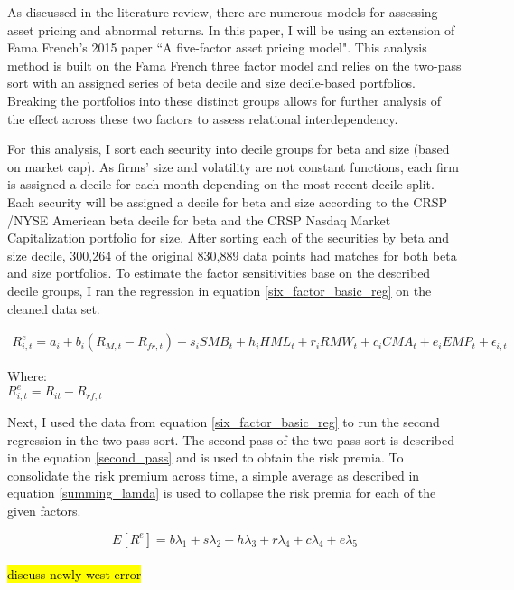 As discussed in the literature review, there are numerous models for assessing asset pricing and abnormal returns. In this paper, I will be using an extension of Fama French's 2015 paper ``A five-factor asset pricing model". This analysis method is built on the Fama French three factor model and relies on the two-pass sort with an assigned series of beta decile and size decile-based portfolios. Breaking the portfolios into these distinct groups allows for further analysis of the effect across these two factors to assess relational interdependency. 

For this analysis, I sort each security into decile groups for beta and size (based on market cap). As firms' size and volatility are not constant functions, each firm is assigned a decile for each month depending on the most recent decile split.  Each security will be assigned a decile for beta and size according to the CRSP /NYSE American beta decile for beta and the CRSP Nasdaq Market Capitalization portfolio for size. After sorting each of the securities by beta and size decile, 300,264 of the original 830,889 data points had matches for both beta and size portfolios. To estimate the factor sensitivities base on the described decile groups, I ran the regression in equation \eqref{six_factor_basic_reg} on the cleaned data set. 




\begin{equation}
\begin{split}
    R_{i,t}^e = a_i+b_i(R_{M,t}-R_{fr,t})+s_iSMB_t+ h_iHML_t+  r_iRMW_t+c_iCMA_t+e_iEMP_t +\epsilon_{i,t}
    \end{split}
    \label{six_factor_basic_reg}
\end{equation}

\begin{center}
Where:\\
    $R_{i,t}^e = R_{it}-R_{rf,t}$
\end{center}

Next, I used the data from equation \eqref{six_factor_basic_reg} to run the second regression in the two-pass sort. The second pass of the two-pass sort is described in the equation  \eqref{second_pass} and is used to obtain the risk premia. To consolidate the risk premium across time, a simple average as described in equation \eqref{summing_lamda} is used to collapse the risk premia for each of the given factors. 

\begin{equation}
    E[R^e]= b\lambda_1+s\lambda_2 +h\lambda_3 +r\lambda_4 +c \lambda_4 + e\lambda_5
    \label{second_pass}
\end{equation}\\

\hl{discuss newly west error }